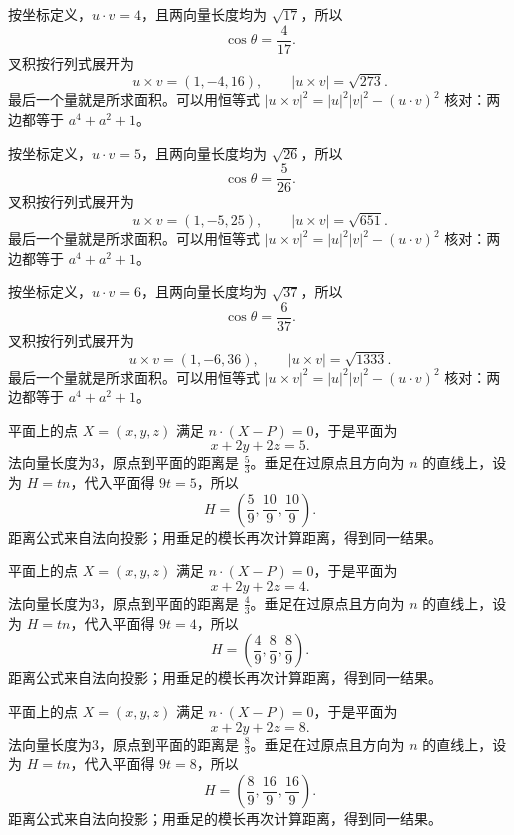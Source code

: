 \documentclass[12pt,fontset=fandol]{ctexart}
\begin{document}
\begin{solve}\label{ans:c31q4}
按坐标定义，$u\cdot v=4$，且两向量长度均为 $\sqrt{17}$，所以
\[
\cos\theta=\frac{4}{17}.
\]
叉积按行列式展开为
\[
u\times v=(1,-4,16),\qquad |u\times v|=\sqrt{273}.
\]
最后一个量就是所求面积。可以用恒等式 $|u\times v|^2=|u|^2|v|^2-(u\cdot v)^2$ 核对：两边都等于 $a^4+a^2+1$。
\end{solve}

\begin{solve}\label{ans:c31q5}
按坐标定义，$u\cdot v=5$，且两向量长度均为 $\sqrt{26}$，所以
\[
\cos\theta=\frac{5}{26}.
\]
叉积按行列式展开为
\[
u\times v=(1,-5,25),\qquad |u\times v|=\sqrt{651}.
\]
最后一个量就是所求面积。可以用恒等式 $|u\times v|^2=|u|^2|v|^2-(u\cdot v)^2$ 核对：两边都等于 $a^4+a^2+1$。
\end{solve}

\begin{solve}\label{ans:c31q6}
按坐标定义，$u\cdot v=6$，且两向量长度均为 $\sqrt{37}$，所以
\[
\cos\theta=\frac{6}{37}.
\]
叉积按行列式展开为
\[
u\times v=(1,-6,36),\qquad |u\times v|=\sqrt{1333}.
\]
最后一个量就是所求面积。可以用恒等式 $|u\times v|^2=|u|^2|v|^2-(u\cdot v)^2$ 核对：两边都等于 $a^4+a^2+1$。
\end{solve}

\begin{solve}\label{ans:c31q7}
平面上的点 $X=(x,y,z)$ 满足 $n\cdot(X-P)=0$，于是平面为
\[
x+2y+2z=5.
\]
法向量长度为3，原点到平面的距离是 $\frac{5}{3}$。垂足在过原点且方向为 $n$ 的直线上，设为 $H=tn$，代入平面得 $9t=5$，所以
\[
H=\left(\frac{5}{9},\frac{10}{9},\frac{10}{9}\right).
\]
距离公式来自法向投影；用垂足的模长再次计算距离，得到同一结果。
\end{solve}

\begin{solve}\label{ans:c31q8}
平面上的点 $X=(x,y,z)$ 满足 $n\cdot(X-P)=0$，于是平面为
\[
x+2y+2z=4.
\]
法向量长度为3，原点到平面的距离是 $\frac{4}{3}$。垂足在过原点且方向为 $n$ 的直线上，设为 $H=tn$，代入平面得 $9t=4$，所以
\[
H=\left(\frac{4}{9},\frac{8}{9},\frac{8}{9}\right).
\]
距离公式来自法向投影；用垂足的模长再次计算距离，得到同一结果。
\end{solve}

\begin{solve}\label{ans:c31q9}
平面上的点 $X=(x,y,z)$ 满足 $n\cdot(X-P)=0$，于是平面为
\[
x+2y+2z=8.
\]
法向量长度为3，原点到平面的距离是 $\frac{8}{3}$。垂足在过原点且方向为 $n$ 的直线上，设为 $H=tn$，代入平面得 $9t=8$，所以
\[
H=\left(\frac{8}{9},\frac{16}{9},\frac{16}{9}\right).
\]
距离公式来自法向投影；用垂足的模长再次计算距离，得到同一结果。
\end{solve}
\end{document}
